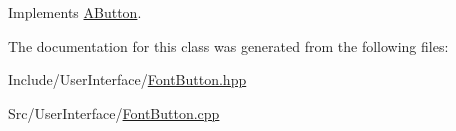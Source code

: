 Implements \mbox{\hyperlink{class_a_button_a6ceaa1f1062009f1206fad570d07afbc}{A\+Button}}.



The documentation for this class was generated from the following files\+:\begin{DoxyCompactItemize}
\item 
Include/\+User\+Interface/\mbox{\hyperlink{_font_button_8hpp}{Font\+Button.\+hpp}}\item 
Src/\+User\+Interface/\mbox{\hyperlink{_font_button_8cpp}{Font\+Button.\+cpp}}\end{DoxyCompactItemize}
